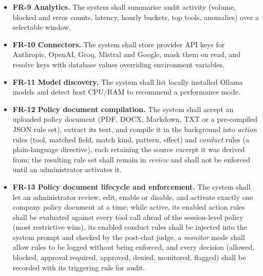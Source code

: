 \documentclass[12pt,a4paper,oneside]{report}
\begin{document}
\begin{itemize}
        (\texttt{fs}, \texttt{bash}, \texttt{web}), and shall write an
        audit row for every \texttt{/api/v1/chat} call containing
        request messages, response, tool calls/results, policy
        decisions, latency, token counts and status code.
  \item \textbf{FR-9 Analytics.} The system shall summarise audit
        activity (volume, blocked and error counts, latency, hourly
        buckets, top tools, anomalies) over a selectable window.
  \item \textbf{FR-10 Connectors.} The system shall store provider API
        keys for Anthropic, OpenAI, Groq, Mistral and Google, mask
        them on read, and resolve keys with database values overriding
        environment variables.
  \item \textbf{FR-11 Model discovery.} The system shall list locally
        installed Ollama models and detect host CPU/RAM to recommend a
        performance mode.
  \item \textbf{FR-12 Policy document compilation.} The system shall
        accept an uploaded policy document (PDF, DOCX, Markdown, TXT
        or a pre-compiled JSON rule set), extract its text, and
        compile it in the background into \emph{action} rules
        (tool, matched field, match kind, pattern, effect) and
        \emph{conduct} rules (a plain-language directive), each
        retaining the source excerpt it was derived from; the
        resulting rule set shall remain in \emph{review} and shall
        not be enforced until an administrator activates it.
  \item \textbf{FR-13 Policy document lifecycle and enforcement.} The
        system shall let an administrator review, edit, enable or
        disable, and activate exactly one company policy document at
        a time; while active, its enabled action rules shall be
        evaluated against every tool call ahead of the session-level
        policy (most restrictive wins), its enabled conduct rules
        shall be injected into the system prompt and checked by the
        post-chat judge, a \emph{monitor} mode shall allow rules to be
        logged without being enforced, and every decision (allowed,
        blocked, approval required, approved, denied, monitored,
        flagged) shall be recorded with its triggering rule for audit.
\end{itemize}
\end{document}
